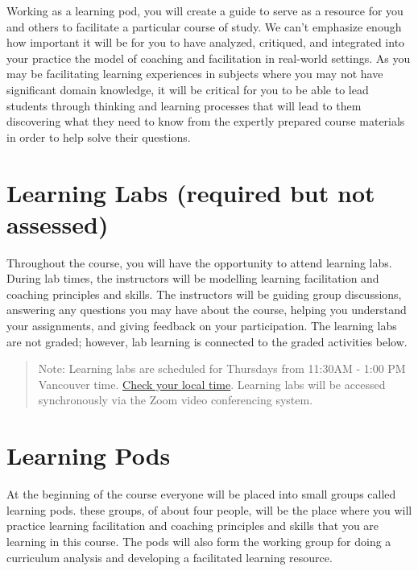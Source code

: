 \documentclass[
]{book}
\begin{document}
Working as a learning pod, you will create a guide to serve as a resource for you and others to facilitate a particular course of study. We can't emphasize enough how important it will be for you to have analyzed, critiqued, and integrated into your practice the model of coaching and facilitation in real-world settings. As you may be facilitating learning experiences in subjects where you may not have significant domain knowledge, it will be critical for you to be able to lead students through thinking and learning processes that will lead to them discovering what they need to know from the expertly prepared course materials in order to help solve their questions.

\hypertarget{learning-labs-required-but-not-assessed}{%
\section{Learning Labs (required but not assessed)}\label{learning-labs-required-but-not-assessed}}

Throughout the course, you will have the opportunity to attend learning labs. During lab times, the instructors will be modelling learning facilitation and coaching principles and skills. The instructors will be guiding group discussions, answering any questions you may have about the course, helping you understand your assignments, and giving feedback on your participation. The learning labs are not graded; however, lab learning is connected to the graded activities below.

\begin{quote}
Note: Learning labs are scheduled for Thursdays from 11:30AM - 1:00 PM Vancouver time. \href{https://www.timeanddate.com/worldclock/converter.html?iso=20210903T200000\&p1=256\&p2=125\&p3=136}{Check your local time}. Learning labs will be accessed synchronously via the Zoom video conferencing system.
\end{quote}

\hypertarget{learning-pods}{%
\section{Learning Pods}\label{learning-pods}}

At the beginning of the course everyone will be placed into small groups called learning pods. these groups, of about four people, will be the place where you will practice learning facilitation and coaching principles and skills that you are learning in this course. The pods will also form the working group for doing a curriculum analysis and developing a facilitated learning resource.
\end{document}
